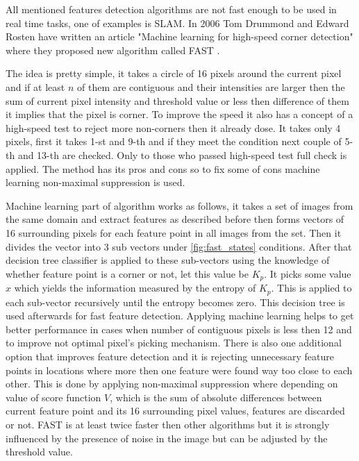 \documentclass[../../../../main]{subfiles}
\begin{document}
All mentioned features detection algorithms are not fast enough to be used in real time tasks, one of examples is \ac{SLAM}. In 2006 Tom Drummond and Edward Rosten have written an article "Machine learning for high-speed corner detection" where they proposed new algorithm called \ac{FAST} \cite{machine_learning_high_speed_corner_rosten}.

The idea is pretty simple, it takes a circle of 16 pixels around the current pixel and if at least $n$ of them are contiguous and their intensities are larger then the sum of current pixel intensity and threshold value or less then difference of them it implies that the pixel is corner. To improve the speed it also has a concept of a high-speed test to reject more non-corners then it already dose. It takes only 4 pixels, first it takes 1-st and 9-th and if they meet the condition next couple of 5-th and 13-th are checked. Only to those who passed high-speed test full check is applied. The method has its pros and cons so to fix some of cons machine learning non-maximal suppression is used.

Machine learning part of algorithm works as follows, it takes a set of images from the same domain and extract features as described before then forms vectors of 16 surrounding pixels for each feature point in all images from the set. Then it divides the vector into 3 sub vectors under \ref{fig:fast_states} conditions. After that decision tree classifier is applied to these sub-vectors using the knowledge of whether feature point is a corner or not, let this value be $K_p$. It picks some value $x$ which yields the information measured by the entropy of $K_p$. This is applied to each sub-vector recursively until the entropy becomes zero. This decision tree is used afterwards for fast feature detection. Applying machine learning helps to get better performance in cases when number of contiguous pixels is less then 12 and to improve not optimal pixel's picking mechanism. There is also one additional option that improves feature detection and it is rejecting unnecessary feature points in locations where more then one feature were found way too close to each other. This is done by applying non-maximal suppression where depending on value of score function $V$, which is the sum of absolute differences between current feature point and its 16 surrounding pixel values, features are discarded or not. \ac{FAST} is at least twice faster then other algorithms but it is strongly influenced by the presence of noise in the image but can be adjusted by the threshold value.
\end{document}

